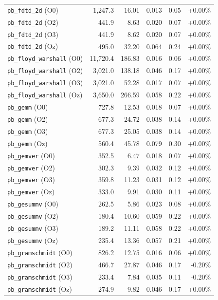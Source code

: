 {\begin{longtable}{lrrrrr}
\texttt{pb\_fdtd\_2d} (O0) & 1,247.3 & 16.01 & 0.013 & 0.05 & +0.00\% \\
\texttt{pb\_fdtd\_2d} (O2) & 441.9 & 8.63 & 0.020 & 0.07 & +0.00\% \\
\texttt{pb\_fdtd\_2d} (O3) & 441.9 & 8.62 & 0.020 & 0.07 & +0.00\% \\
\texttt{pb\_fdtd\_2d} (Oz) & 495.0 & 32.20 & 0.064 & 0.24 & +0.00\% \\
\texttt{pb\_floyd\_warshall} (O0) & 11,720.4 & 186.83 & 0.016 & 0.06 & +0.00\% \\
\texttt{pb\_floyd\_warshall} (O2) & 3,021.0 & 138.18 & 0.046 & 0.17 & +0.00\% \\
\texttt{pb\_floyd\_warshall} (O3) & 3,021.0 & 52.28 & 0.017 & 0.07 & +0.00\% \\
\texttt{pb\_floyd\_warshall} (Oz) & 3,650.0 & 266.59 & 0.058 & 0.22 & +0.00\% \\
\texttt{pb\_gemm} (O0) & 727.8 & 12.53 & 0.018 & 0.07 & +0.00\% \\
\texttt{pb\_gemm} (O2) & 677.3 & 24.72 & 0.038 & 0.14 & +0.00\% \\
\texttt{pb\_gemm} (O3) & 677.3 & 25.05 & 0.038 & 0.14 & +0.00\% \\
\texttt{pb\_gemm} (Oz) & 560.4 & 45.78 & 0.079 & 0.30 & +0.00\% \\
\texttt{pb\_gemver} (O0) & 352.5 & 6.47 & 0.018 & 0.07 & +0.00\% \\
\texttt{pb\_gemver} (O2) & 302.3 & 9.39 & 0.032 & 0.12 & +0.00\% \\
\texttt{pb\_gemver} (O3) & 359.8 & 11.23 & 0.031 & 0.12 & +0.00\% \\
\texttt{pb\_gemver} (Oz) & 333.0 & 9.91 & 0.030 & 0.11 & +0.00\% \\
\texttt{pb\_gesummv} (O0) & 262.5 & 5.86 & 0.023 & 0.08 & +0.00\% \\
\texttt{pb\_gesummv} (O2) & 180.4 & 10.60 & 0.059 & 0.22 & +0.00\% \\
\texttt{pb\_gesummv} (O3) & 189.2 & 11.11 & 0.058 & 0.22 & +0.00\% \\
\texttt{pb\_gesummv} (Oz) & 235.4 & 13.36 & 0.057 & 0.21 & +0.00\% \\
\texttt{pb\_gramschmidt} (O0) & 826.2 & 12.75 & 0.016 & 0.06 & +0.00\% \\
\texttt{pb\_gramschmidt} (O2) & 466.7 & 27.87 & 0.046 & 0.17 & -0.20\% \\
\texttt{pb\_gramschmidt} (O3) & 233.4 & 7.84 & 0.035 & 0.11 & -0.20\% \\
\texttt{pb\_gramschmidt} (Oz) & 274.9 & 9.82 & 0.046 & 0.17 & +0.00\% \\

\end{longtable}}
